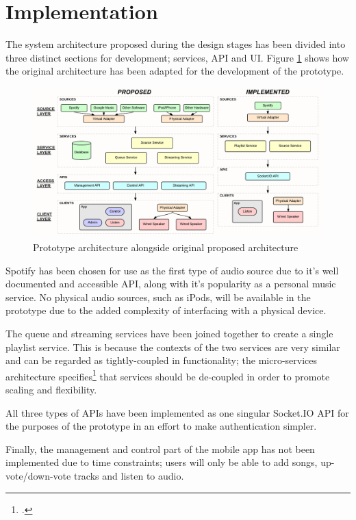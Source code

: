 \section{Implementation}
The system architecture proposed during the design stages has been divided into three distinct sections for development; services, API and UI. Figure \ref{fig:architecture-changes} shows how the original architecture has been adapted for the development of the prototype.

\begin{figure}[h!]
  \centering
  \includegraphics[width=1.02\textwidth]{./img/architecture-changes.png}
  \caption{Prototype architecture alongside original proposed architecture}
  \label{fig:architecture-changes}
\end{figure}

Spotify has been chosen for use as the first type of audio source due to it's well documented and accessible API, along with it's popularity as a personal music service. No physical audio sources, such as iPods, will be available in the prototype due to the added complexity of interfacing with a physical device.

The queue and streaming services have been joined together to create a single playlist service. This is because the contexts of the two services are very similar and can be regarded as tightly-coupled in functionality; the micro-services architecture specifies\footcite{microservicesio} that services should be de-coupled in order to promote scaling and flexibility.

All three types of APIs have been implemented as one singular Socket.IO API for the purposes of the prototype in an effort to make authentication simpler.

Finally, the management and control part of the mobile app has not been implemented due to time constraints; users will only be able to add songs, up-vote/down-vote tracks and listen to audio.

